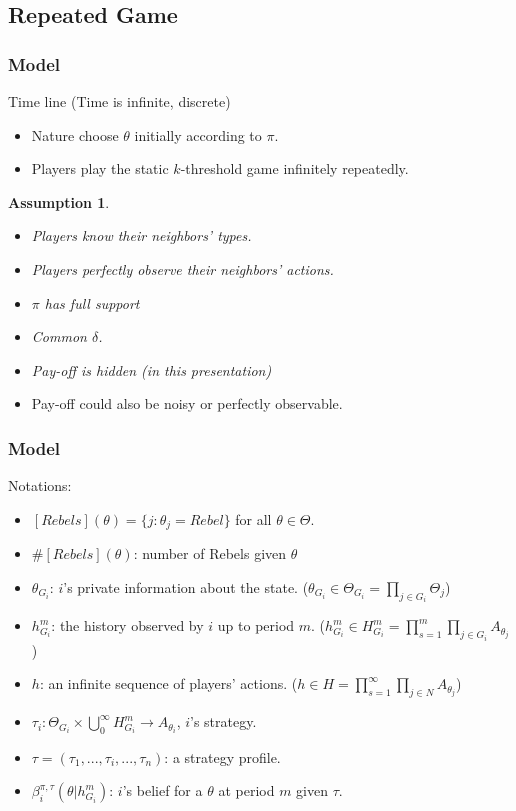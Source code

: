 \documentclass[9pt]{beamer}
\newtheorem{assumption}{Assumption}[section]
\begin{document}
\subsection{Repeated Game}
\begin{frame}
  \frametitle{Model}
Time line (Time is infinite, discrete)
  \begin{itemize}

  \item Nature choose $\theta$ initially according to $\pi$.
  \item Players play the static $k$-threshold game infinitely repeatedly.


  \end{itemize}

\begin{assumption}
\begin{itemize}
\item Players know their neighbors' types.
\item Players perfectly observe their neighbors' actions. 
  \item $\pi$ has full support

\item Common $\delta$. 
\item Pay-off is hidden (in this presentation)
\end{itemize}

\end{assumption}
\begin{itemize}
\item Pay-off could also be noisy or perfectly observable.
\end{itemize}
\end{frame}

\begin{frame}
  \frametitle{Model}

Notations:
\begin{itemize}
\item $[Rebels](\theta)=\{j:\theta_j=Rebel\}$ for all $\theta\in \Theta$. 
\item $\# [Rebels](\theta)$: number of Rebels given $\theta$ \pause
\item $\theta_{G_i}$: $i$'s private information about the state. ($\theta_{G_i}\in \Theta_{G_i}=\prod_{j\in G_i}\Theta_j$)
\item $h^{m}_{G_i}$: the history observed by $i$ up to period $m$. ($h^{m}_{G_i}\in H^{m}_{G_i}=\prod^m_{s=1}\prod_{j\in G_i}A_{\theta_j}$)
\item $h$: an infinite sequence of players' actions. ($h\in H=\prod^{\infty}_{s=1}\prod_{j\in N}A_{\theta_j}$) \pause 
\item $\tau_i:\Theta_{G_i}\times \bigcup^{\infty}_{0} H^{m}_{G_i} \rightarrow A_{\theta_i}$, $i$'s strategy.
\item $\tau=(\tau_1,...,\tau_i,...,\tau_n)$: a strategy profile. \pause
\item $\beta^{\pi,\tau}_i(\theta|h^{m}_{G_i})$: $i$'s belief for a $\theta$ at period $m$ given $\tau$.

 
\end{itemize}

\end{frame}
\end{document}
